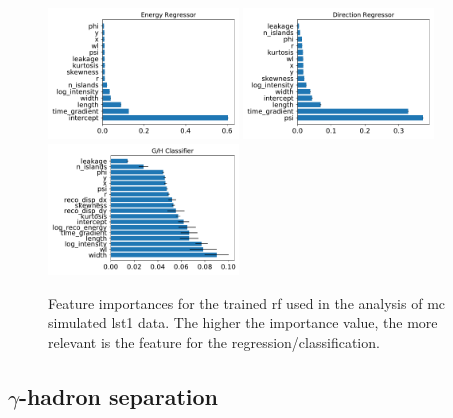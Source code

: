 \documentclass[main.tex]{subfiles}
\begin{document}
\begin{figure}
\centering
\includegraphics[width=0.45\textwidth]{Pictures/reg_energy_importances.pdf}
\includegraphics[width=0.45\textwidth]{Pictures/reg_disp_vector_importances.pdf}
\includegraphics[width=0.45\textwidth]{Pictures/gls_importances.pdf}
  \caption{Feature importances for the trained \gls{rf} used in the analysis of \gls{mc} simulated \gls{lst}1 data. The higher the importance value, the more relevant is the feature for the regression/classification. }
    \label{fig:importances}
\end{figure}


\subsection{$\gamma$-hadron separation} \label{sec:gammahsep}
\end{document}
